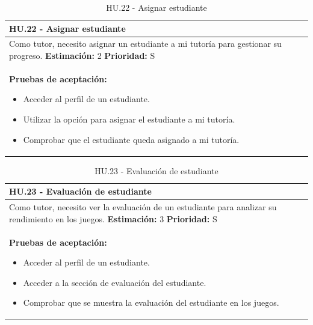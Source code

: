 \begin{table}[H]
\centering
\begin{tabularx}{\textwidth}{|X|}
\hline
\textbf{HU.22 - Asignar estudiante}  \\
\hline
Como tutor, necesito asignar un estudiante a mi tutoría para gestionar su progreso.
\clearpage
\textbf{Estimación: }2
\clearpage
\textbf{Prioridad: }S
\\
\hline
\textbf{Pruebas de aceptación:}
\begin{itemize}
    \item Acceder al perfil de un estudiante.
    \item Utilizar la opción para asignar el estudiante a mi tutoría.
    \item Comprobar que el estudiante queda asignado a mi tutoría.
\end{itemize}
\\
\hline
\end{tabularx}
\caption{HU.22 - Asignar estudiante}
\end{table}

\begin{table}[H]
\centering
\begin{tabularx}{\textwidth}{|X|}
\hline
\textbf{HU.23 - Evaluación de estudiante}  \\
\hline
Como tutor, necesito ver la evaluación de un estudiante para analizar su rendimiento en los juegos.
\clearpage
\textbf{Estimación: }3
\clearpage
\textbf{Prioridad: }S
\\
\hline
\textbf{Pruebas de aceptación:}
\begin{itemize}
    \item Acceder al perfil de un estudiante.
    \item Acceder a la sección de evaluación del estudiante.
    \item Comprobar que se muestra la evaluación del estudiante en los juegos.
\end{itemize}
\\
\hline
\end{tabularx}
\caption{HU.23 - Evaluación de estudiante}
\end{table}

